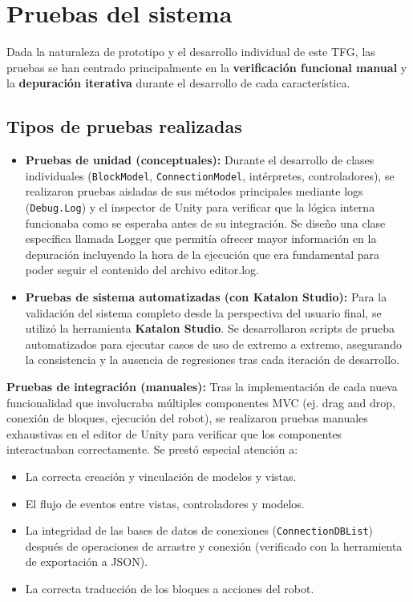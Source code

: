 \section{Pruebas del sistema}
Dada la naturaleza de prototipo y el desarrollo individual de este TFG, las pruebas se han centrado principalmente en la \textbf{verificación funcional manual} y la \textbf{depuración iterativa} durante el desarrollo de cada característica.

\subsection{Tipos de pruebas realizadas}
\begin{itemize}
	\item \textbf{Pruebas de unidad (conceptuales):} Durante el desarrollo de clases individuales (\texttt{BlockModel}, \texttt{ConnectionModel}, intérpretes, controladores), se realizaron pruebas aisladas de sus métodos principales mediante logs (\texttt{Debug.Log}) y el inspector de Unity para verificar que la lógica interna funcionaba como se esperaba antes de su integración. Se diseño una clase específica llamada Logger que permitía ofrecer mayor información en la depuración incluyendo la hora de la ejecución que era fundamental para poder seguir el contenido del archivo editor.log.
	 \item \textbf{Pruebas de sistema automatizadas (con Katalon Studio):} Para la validación del sistema completo desde la perspectiva del usuario final, se utilizó la herramienta \textbf{Katalon Studio}. Se desarrollaron scripts de prueba automatizados para ejecutar casos de uso de extremo a extremo, asegurando la consistencia y la ausencia de regresiones tras cada iteración de desarrollo.
	\end{itemize}
	\item \textbf{Pruebas de integración (manuales):} Tras la implementación de cada nueva funcionalidad que involucraba múltiples componentes MVC (ej. drag and drop, conexión de bloques, ejecución del robot), se realizaron pruebas manuales exhaustivas en el editor de Unity para verificar que los componentes interactuaban correctamente. Se prestó especial atención a:
	\begin{itemize}
		\item La correcta creación y vinculación de modelos y vistas.
		\item El flujo de eventos entre vistas, controladores y modelos.
		\item La integridad de las bases de datos de conexiones (\texttt{ConnectionDBList}) después de operaciones de arrastre y conexión (verificado con la herramienta de exportación a JSON).
		\item La correcta traducción de los bloques a acciones del robot.
	\end{itemize}
